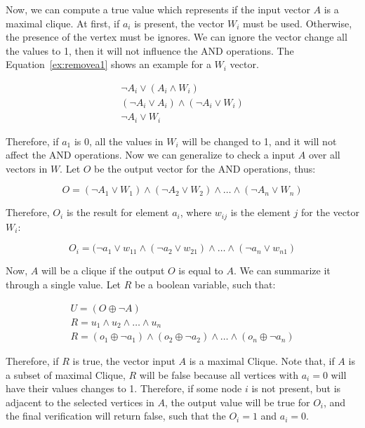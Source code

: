 \documentclass[a4paper,12pt]{article}
\begin{document}
Now, we can compute a true value which represents if the input vector $A$ is a maximal clique. At first, if $a_i$ is present, the vector $W_i$ must be used. Otherwise, the presence of the vertex must be ignores. We can ignore the vector change all the values to 1, then it will not influence the AND operations. The Equation~\ref{ex:removea1} shows an example for a $W_i$ vector. 

\begin{align}
	\neg A_i \lor (A_i \land W_i) \\
	(\neg A_i \lor A_i) \land (\neg A_i \lor W_i) \\
	\neg A_i \lor W_i \label{ex:removea1}
\end{align}

Therefore, if $a_1$ is 0, all the values in $W_i$ will be changed to 1, and it will not affect the AND operations. Now we can generalize to check a input $A$ over all vectors in $W$. Let $O$ be the output vector for the AND operations, thus:

\begin{equation}
	O = (\neg A_1 \lor W_1) \land (\neg A_2 \lor W_2) \land \dots \land (\neg A_n \lor W_n)
\end{equation}

Therefore, $O_i$ is the result for element $a_i$, where $w_{ij}$ is the element $j$ for the vector $W_i$:

\begin{equation}
O_i = (\neg a_1 \lor w_{11} \land (\neg a_2 \lor w_{21}) \land \dots \land (\neg a_n \lor w_{n1})
\end{equation}

Now, $A$ will be a clique if the output $O$ is equal to $A$. We can summarize it through a single value. Let $R$ be a boolean variable, such that:

\begin{align}
	U = (O \oplus \neg A)\\
	R = u_1 \land u_2 \land \dots \land u_n\\
	R = (o_1 \oplus \neg a_1) \land (o_2 \oplus \neg a_2) \land \dots \land (o_n \oplus \neg a_n)
\end{align}

Therefore, if $R$ is true, the vector input $A$ is a maximal Clique. Note that, if $A$ is a subset of maximal Clique, $R$ will be false because all vertices with $a_i = 0$ will have their values changes to 1. Therefore, if some node $i$ is not present, but is adjacent to the selected vertices in $A$, the output value will be true for $O_i$, and the final verification will return false, such that the $O_i = 1$ and $a_i = 0$.
\end{document}
